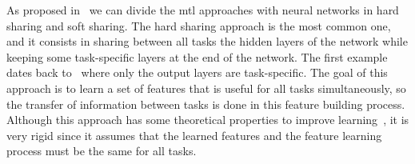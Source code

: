 As proposed in~\cite{Ruder17a} we can divide the \acrshort{mtl} approaches with neural networks in hard sharing and soft sharing.
The hard sharing approach is the most common one, and it consists in sharing between all tasks the hidden layers of the network while keeping some task-specific layers at the end of the network. The first example dates back to~\cite{Caruana97} where only the output layers are task-specific. The goal of this approach is to learn a set of features that is useful for all tasks simultaneously, so the transfer of information between tasks is done in this feature building process. Although this approach has some theoretical properties to improve learning~\citep{baxter2000model}, it is very rigid since it assumes that the learned features and the feature learning process must be the same for all tasks.

